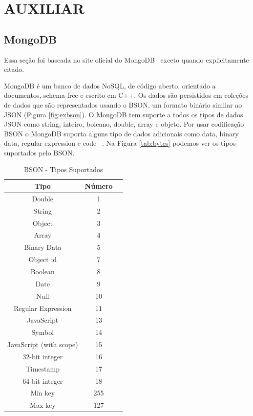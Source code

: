 \chapter{AUXILIAR}


\section{MongoDB}


Essa seção foi baseada no site oficial do MongoDB~\cite{sitemongodb} exceto quando explicitamente citado.

MongoDB é um banco de dados NoSQL,  de código aberto,  orientado a documentos, schema-free e escrito em C++.  Os dados são persistidos em coleções de dados que são representados usando o BSON, um formato binário similar ao JSON (Figura \ref{fig:exbson}). O MongoDB tem suporte a todos os tipos de dados  JSON  como string, inteiro, boleano, double, array e objeto. Por usar codificação BSON o MongoDB suporta alguns tipo de dados adicionais como data, binary data, regular expression e code ~\cite{nosqlprofessional}. Na Figura \ref{tab:bytes} podemos ver os tipos suportados pelo BSON.

\begin{table}
	\caption{BSON - Tipos Suportados}
	\begin{center}
	\begin{tabular}{ccc}
		\hline
			\textbf{Tipo} & \textbf{Número} \\
		\hline
			Double & 1 \\
			String & 2 \\
			Object & 3 \\
			Array & 4 \\
			Binary Data & 5 \\
			Object id & 7 \\
			Boolean & 8 \\
			Date & 9 \\
			Null & 10 \\
			Regular Expression & 11 \\
			JavaScript & 13 \\
			Symbol & 14 \\
			JavaScript (with scope) & 15 \\
			32-bit integer & 16 \\
			Timestamp& 17 \\
			64-bit integer & 18 \\
			Min key & 255 \\
			Max key & 127 \\
		\hline
	\end {tabular}
	\end{center}
	\label{tab:bsontypes}
\end{table}

